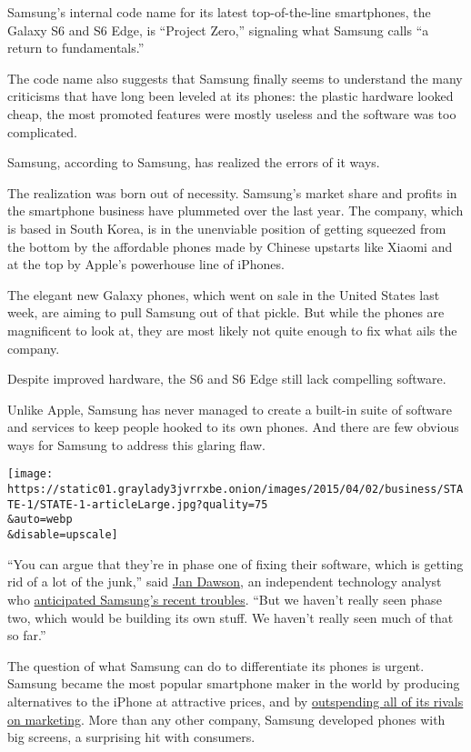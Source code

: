 Samsung's internal code name for its latest top-of-the-line smartphones,
the Galaxy S6 and S6 Edge, is ``Project Zero,'' signaling what Samsung
calls ``a return to fundamentals.''

The code name also suggests that Samsung finally seems to understand the
many criticisms that have long been leveled at its phones: the plastic
hardware looked cheap, the most promoted features were mostly useless
and the software was too complicated.

Samsung, according to Samsung, has realized the errors of it ways.

The realization was born out of necessity. Samsung's market share and
profits in the smartphone business have plummeted over the last year.
The company, which is based in South Korea, is in the unenviable
position of getting squeezed from the bottom by the affordable phones
made by Chinese upstarts like Xiaomi and at the top by Apple's
powerhouse line of iPhones.

The elegant new Galaxy phones, which went on sale in the United States
last week, are aiming to pull Samsung out of that pickle. But while the
phones are magnificent to look at, they are most likely not quite enough
to fix what ails the company.

Despite improved hardware, the S6 and S6 Edge still lack compelling
software.

Unlike Apple, Samsung has never managed to create a built-in suite of
software and services to keep people hooked to its own phones. And there
are few obvious ways for Samsung to address this glaring flaw.

\texttt{[image: https://static01.graylady3jvrrxbe.onion/images/2015/04/02/business/STATE-1/STATE-1-articleLarge.jpg?quality=75\\\&auto=webp\\\&disable=upscale]}

``You can argue that they're in phase one of fixing their software,
which is getting rid of a lot of the junk,'' said
\href{http://www.beyonddevic.es/}{Jan Dawson}, an independent technology
analyst who
\href{https://techpinions.com/is-samsungs-exceptionalism-coming-to-an-end/32325}{anticipated
Samsung's recent troubles}. ``But we haven't really seen phase two,
which would be building its own stuff. We haven't really seen much of
that so far.''

The question of what Samsung can do to differentiate its phones is
urgent. Samsung became the most popular smartphone maker in the world by
producing alternatives to the iPhone at attractive prices, and by
\href{http://www.businessinsider.com/chart-of-the-day-samsung-marketing-budget-2013-6}{outspending
all of its rivals on marketing}. More than any other company, Samsung
developed phones with big screens, a surprising hit with consumers.

